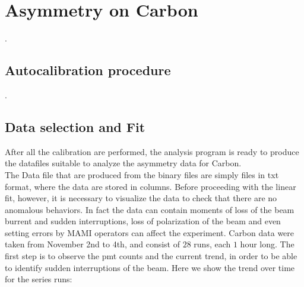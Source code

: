 \section{Asymmetry on Carbon}
.
\subsection{Autocalibration procedure}
.
\subsection{Data selection and Fit}

After all the calibration are performed, the analysis program is ready to produce the datafiles suitable to analyze the asymmetry data for Carbon. \\
The Data file that are produced from the binary files are simply files in txt format, where the data are stored in columns. Before proceeding with the linear fit, however, it is necessary to visualize the data to check that there are no anomalous behaviors. In fact the data can contain moments of loss of the beam burrent and sudden interruptions, loss of polarization of the beam and even setting errors by MAMI operators can affect the experiment. Carbon data were taken from November 2nd to 4th, and consist of $28$ runs, each $1$ hour long.
The first step is to observe the pmt counts and the current trend, in order to be able to identify sudden interruptions of the beam. Here we show the trend over time for the series runs: 

\begin{figure}[hbtp]
\centering
{}
\end{figure}

